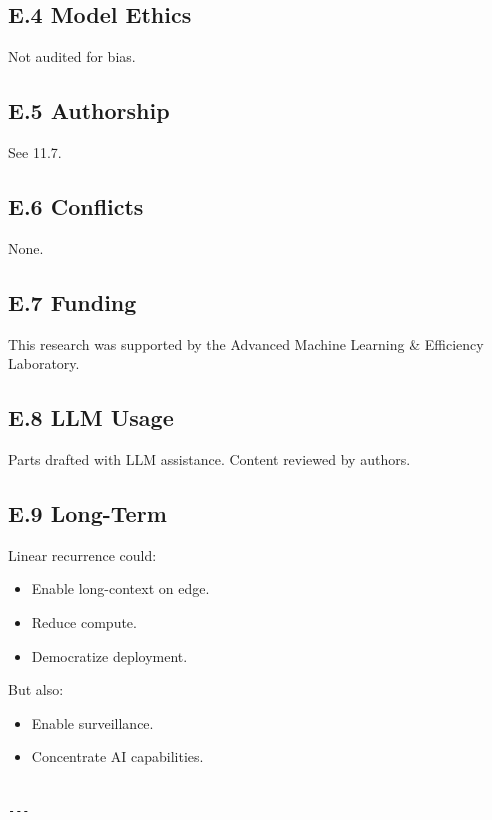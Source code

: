 \subsection{E.4 Model Ethics}

Not audited for bias.

\subsection{E.5 Authorship}

See  11.7.

\subsection{E.6 Conflicts}

None.

\subsection{E.7 Funding}

This research was supported by the Advanced Machine Learning \& Efficiency Laboratory.

\subsection{E.8 LLM Usage}

Parts drafted with LLM assistance. Content reviewed by authors.

\subsection{E.9 Long-Term}

Linear recurrence could:
\begin{itemize}
\item Enable long-context on edge.
\item Reduce compute.
\item Democratize deployment.

\end{itemize}
But also:
\begin{itemize}
\item Enable surveillance.
\item Concentrate AI capabilities.
\end{itemize}
\begin{lstlisting}

---
\end{lstlisting}